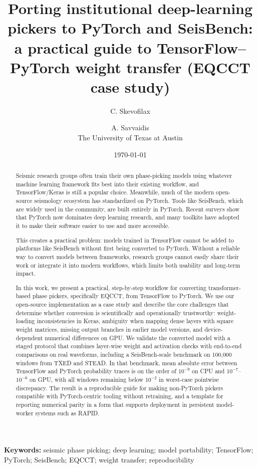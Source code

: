 \documentclass[11pt]{article}
\title{Porting institutional deep-learning pickers to PyTorch and SeisBench: a practical guide to TensorFlow--PyTorch weight transfer (EQCCT case study)}
\author{C. Skevofilax \and A. Savvaidis \\[0.5em] \normalsize The University of Texas at Austin}
\date{\today}
\begin{document}
\maketitle

\noindent\textbf{Keywords:} seismic phase picking; deep learning; model portability; TensorFlow; PyTorch; SeisBench; EQCCT; weight transfer; reproducibility

\vspace{1em}

\begin{abstract}
Seismic research groups often train their own phase-picking models using whatever machine learning framework fits best into their existing workflow, and TensorFlow/Keras is still a popular choice. Meanwhile, much of the modern open-source seismology ecosystem has standardized on PyTorch. Tools like SeisBench, which are widely used in the community, are built entirely in PyTorch. Recent surveys show that PyTorch now dominates deep learning research, and many toolkits have adopted it to make their software easier to use and more accessible.

This creates a practical problem: models trained in TensorFlow cannot be added to platforms like SeisBench without first being converted to PyTorch. Without a reliable way to convert models between frameworks, research groups cannot easily share their work or integrate it into modern workflows, which limits both usability and long-term impact.

In this work, we present a practical, step-by-step workflow for converting transformer-based phase pickers, specifically EQCCT, from TensorFlow to PyTorch. We use our open-source implementation as a case study and describe the core challenges that determine whether conversion is scientifically and operationally trustworthy: weight-loading inconsistencies in Keras, ambiguity when mapping dense layers with square weight matrices, missing output branches in earlier model versions, and device-dependent numerical differences on GPU. We validate the converted model with a staged protocol that combines layer-wise weight and activation checks with end-to-end comparisons on real waveforms, including a SeisBench-scale benchmark on 100{,}000 windows from TXED and STEAD. In that benchmark, mean absolute error between TensorFlow and PyTorch probability traces is on the order of $10^{-9}$ on CPU and $10^{-7}$--$10^{-6}$ on GPU, with all windows remaining below $10^{-2}$ in worst-case pointwise discrepancy. The result is a reproducible guide for making non-PyTorch pickers compatible with PyTorch-centric tooling without retraining, and a template for reporting numerical parity in a form that supports deployment in persistent model-worker systems such as RAPID.
\end{abstract}


\end{document}
